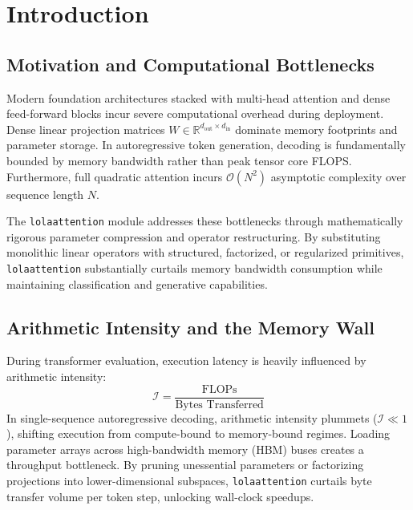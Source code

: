 \section{Introduction}

\subsection{Motivation and Computational Bottlenecks}
Modern foundation architectures stacked with multi-head attention and dense feed-forward blocks incur severe computational overhead during deployment. Dense linear projection matrices $W \in \mathbb{R}^{d_{\text{out}} \times d_{\text{in}}}$ dominate memory footprints and parameter storage. In autoregressive token generation, decoding is fundamentally bounded by memory bandwidth rather than peak tensor core FLOPS. Furthermore, full quadratic attention incurs $\mathcal{O}(N^2)$ asymptotic complexity over sequence length $N$.

The \texttt{lolaattention} module addresses these bottlenecks through mathematically rigorous parameter compression and operator restructuring. By substituting monolithic linear operators with structured, factorized, or regularized primitives, \texttt{lolaattention} substantially curtails memory bandwidth consumption while maintaining classification and generative capabilities.

\subsection{Arithmetic Intensity and the Memory Wall}
During transformer evaluation, execution latency is heavily influenced by arithmetic intensity:
\[
\mathcal{I} = \frac{\text{FLOPs}}{\text{Bytes Transferred}}
\]
In single-sequence autoregressive decoding, arithmetic intensity plummets ($\mathcal{I} \ll 1$), shifting execution from compute-bound to memory-bound regimes. Loading parameter arrays across high-bandwidth memory (HBM) buses creates a throughput bottleneck. By pruning unessential parameters or factorizing projections into lower-dimensional subspaces, \texttt{lolaattention} curtails byte transfer volume per token step, unlocking wall-clock speedups.

